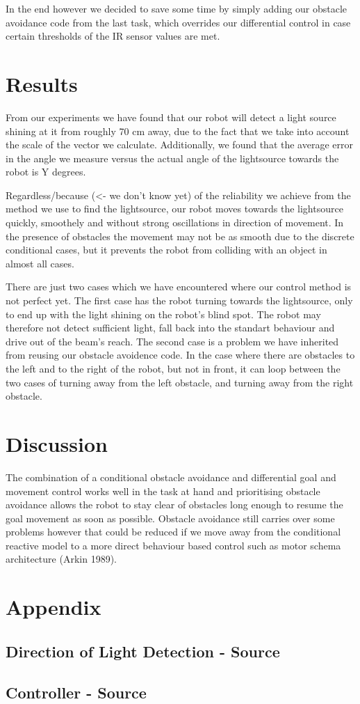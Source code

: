 \documentclass[paper=a4, fontsize=12pt]{scrartcl}	%
\numberwithin{equation}{section}		%
\numberwithin{figure}{section}			%
\numberwithin{table}{section}				%
\begin{document}
In the end however we decided to save some time by simply adding our obstacle avoidance code from the last task, which overrides our differential control in case certain thresholds of the IR sensor values are met.
\section{Results}
From our experiments we have found that our robot will detect a light source shining at it from roughly 70 cm away, due to the fact that we take into account the scale of the vector we calculate. Additionally, we found that the average error in the angle we measure versus the actual angle of the lightsource towards the robot is Y degrees.

Regardless/because (<- we don't know yet) of the reliability we achieve from the method we use to find the lightsource, our robot moves towards the lightsource quickly, smoothely and without strong oscillations in direction of movement. In the presence of obstacles the movement may not be as smooth due to the discrete conditional cases, but it prevents the robot from colliding with an object in almost all cases.

There are just two cases which we have encountered where our control method is not perfect yet. The first case has the robot turning towards the lightsource, only to end up with the light shining on the robot's blind spot. The robot may therefore not detect sufficient light, fall back into the standart behaviour and drive out of the beam's reach. The second case is a problem we have inherited from reusing our obstacle avoidence code. In the case where there are obstacles to the left and to the right of the robot, but not in front, it can loop between the two cases of turning away from the left obstacle, and turning away from the right obstacle.
\section{Discussion}
The combination of a conditional obstacle avoidance and differential goal and movement control works well in the task at hand and prioritising obstacle avoidance allows the robot to stay clear of obstacles long enough to resume the goal movement as soon as possible. Obstacle avoidance still carries over some problems however that could be reduced if we move away from the conditional reactive model to a more direct behaviour based control such as motor schema architecture (Arkin 1989).
\section{Appendix}
\subsection{Direction of Light Detection - Source}

\subsection{Controller - Source}


\end{document}
